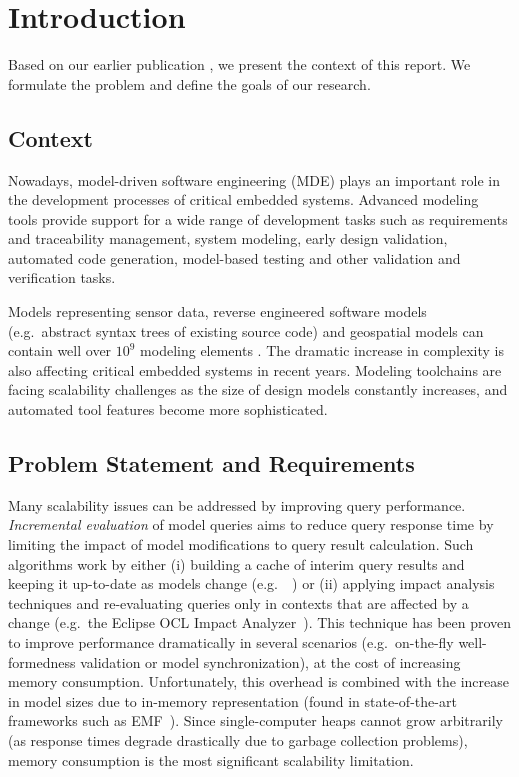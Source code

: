 \chapter{Introduction}
\label{chap:introduction}

Based on our earlier publication \cite{Izso:2013:IIG:2487766.2487772}, we present the context of this report. We formulate the problem and define the goals of our research.

\section{Context}

Nowadays, model-driven software engineering (MDE) plays an important role in the development processes of critical embedded systems. Advanced modeling tools provide support for a wide range of development tasks such as requirements and traceability management, system modeling, early design validation, automated code generation, model-based testing and other validation and verification tasks. 

Models representing sensor data, reverse engineered software models (e.g.\ abstract syntax trees of existing source code) and geospatial models can contain well over $10^9$ modeling elements \cite{Scheidgen12}. The dramatic increase in complexity is also affecting critical embedded systems in recent years. Modeling toolchains are facing scalability challenges as the size of design models constantly increases, and automated tool features become more sophisticated.

\section{Problem Statement and Requirements}

Many scalability issues can be addressed by improving query performance. \emph{Incremental evaluation} of model queries aims to reduce query response time by limiting the impact of model modifications to query result calculation. Such algorithms work by either (i) building a cache of interim query results and keeping it up-to-date as models change (e.g.\ \eiq{}~\cite{models10}) or (ii) applying impact analysis techniques and re-evaluating queries only in contexts that are affected by a change (e.g.\ the Eclipse OCL Impact Analyzer~\cite{OCLIA}). This technique has been proven to improve performance dramatically in several scenarios (e.g.\ on-the-fly well-formedness validation or model synchronization), at the cost of increasing memory consumption. Unfortunately, this overhead is combined with the increase in model sizes due to in-memory representation (found in state-of-the-art frameworks such as EMF~\cite{EMF}). Since single-computer heaps cannot grow arbitrarily (as response times degrade drastically due to garbage collection problems), memory consumption is the most significant scalability limitation.%

